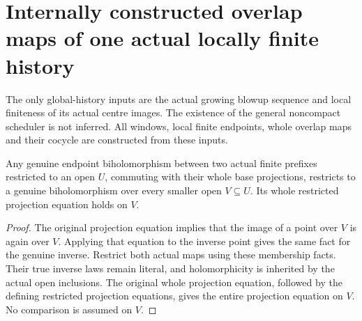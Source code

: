 \section{Internally constructed overlap maps of one actual locally finite history}

The only global-history inputs are the actual growing blowup sequence and
local finiteness of its actual centre images. The existence of the general
noncompact scheduler is not inferred. All windows, local finite endpoints,
whole overlap maps and their cocycle are constructed from these inputs.

\begin{lemma}
\label{hir:actual-locally-finite-prefix-comparison-restriction}
\leanok
Any genuine endpoint biholomorphism between two actual finite prefixes
restricted to an open $U$, commuting with their whole base projections,
restricts to a genuine biholomorphism over every smaller open $V\subseteq U$.
Its whole restricted projection equation holds on $V$.
\end{lemma}
\begin{proof}
The original projection equation implies that the image of a point over $V$
is again over $V$. Applying that equation to the inverse point gives the
same fact for the genuine inverse. Restrict both actual maps using these
membership facts. Their true inverse laws remain literal, and holomorphicity
is inherited by the actual open inclusions. The original whole projection
equation, followed by the defining restricted projection equations, gives
the entire projection equation on $V$. No comparison is assumed on $V$.
\end{proof}

